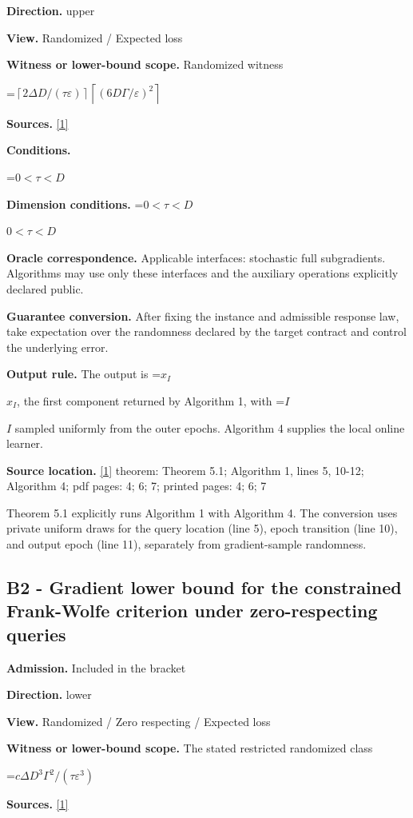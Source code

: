 \documentclass[10pt,a4paper]{article}
\newcommand{\AtlasMath}[1]{\par\begingroup\centering\setbox0=\hbox{$\displaystyle #1$}\ifdim\wd0>1.4\linewidth\typeout{ATLAS WIDE FORMULA: \the\wd0}\fi\ifdim\wd0>\linewidth\resizebox{\linewidth}{!}{\box0}\else\box0\fi\par\endgroup}
\newcommand{\AtlasInlineMath}[1]{\begingroup\setbox0=\hbox{$#1$}\ifdim\wd0>.4\linewidth\endgroup\AtlasMath{#1}\else\endgroup$#1$\fi}
\begin{document}
\textbf{Direction.} upper

\textbf{View.} Randomized / Expected loss

\textbf{Witness or lower-bound scope.} Randomized witness

\AtlasMath{\left\lceil2\Delta D/(\tau\varepsilon)\right\rceil\left\lceil(6D\Gamma/\varepsilon)^2\right\rceil}
\textbf{Sources.} \href{https://arxiv.org/pdf/2610.13787v1}{[1]}

\textbf{Conditions.} 
\AtlasMath{0<\tau<D}


\textbf{Dimension conditions.} \AtlasInlineMath{0<\tau<D}

\textbf{Oracle correspondence.} Applicable interfaces: stochastic full subgradients. Algorithms may use only these interfaces and the auxiliary operations explicitly declared public.

\textbf{Guarantee conversion.} After fixing the instance and admissible response law, take expectation over the randomness declared by the target contract and control the underlying error.

\textbf{Output rule.} The output is \AtlasInlineMath{x_I}, the first component returned by Algorithm 1, with \AtlasInlineMath{I} sampled uniformly from the outer epochs. Algorithm 4 supplies the local online learner.

\textbf{Source location.} \href{https://arxiv.org/pdf/2610.13787v1}{[1]} theorem: Theorem 5.1; Algorithm 1, lines 5, 10-12; Algorithm 4; pdf pages: 4; 6; 7; printed pages: 4; 6; 7

Theorem 5.1 explicitly runs Algorithm 1 with Algorithm 4. The conversion uses private uniform draws for the query location (line 5), epoch transition (line 10), and output epoch (line 11), separately from gradient-sample randomness.

\subsection{B2 - Gradient lower bound for the constrained Frank-Wolfe criterion under zero-respecting queries}
\textbf{Admission.} Included in the bracket

\textbf{Direction.} lower

\textbf{View.} Randomized / Zero respecting / Expected loss

\textbf{Witness or lower-bound scope.} The stated restricted randomized class

\AtlasMath{c\Delta D^3\Gamma^2/(\tau\varepsilon^3)}
\textbf{Sources.} \href{https://arxiv.org/pdf/2610.13787v1}{[1]}
\end{document}
